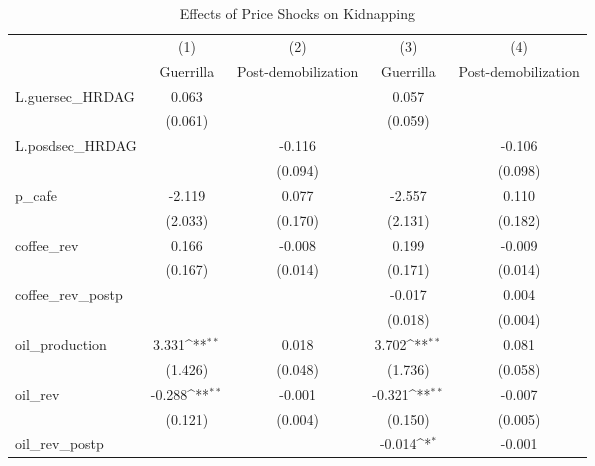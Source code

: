 \begin{table}[htbp]\centering
\def\sym#1{\ifmmode^{#1}\else\(^{#1}\)\fi}
\caption{Effects of Price Shocks on Kidnapping}
\begin{tabular}{l*{4}{c}}
\hline\hline
                &\multicolumn{1}{c}{(1)}&\multicolumn{1}{c}{(2)}&\multicolumn{1}{c}{(3)}&\multicolumn{1}{c}{(4)}\\
                &\multicolumn{1}{c}{Guerrilla}&\multicolumn{1}{c}{Post-demobilization}&\multicolumn{1}{c}{Guerrilla}&\multicolumn{1}{c}{Post-demobilization}\\
\hline
L.guersec\_HRDAG &    0.063         &                  &    0.057         &                  \\
                &  (0.061)         &                  &  (0.059)         &                  \\
[1em]
L.posdsec\_HRDAG &                  &   -0.116         &                  &   -0.106         \\
                &                  &  (0.094)         &                  &  (0.098)         \\
[1em]
p\_cafe          &   -2.119         &    0.077         &   -2.557         &    0.110         \\
                &  (2.033)         &  (0.170)         &  (2.131)         &  (0.182)         \\
[1em]
coffee\_rev      &    0.166         &   -0.008         &    0.199         &   -0.009         \\
                &  (0.167)         &  (0.014)         &  (0.171)         &  (0.014)         \\
[1em]
coffee\_rev\_postp&                  &                  &   -0.017         &    0.004         \\
                &                  &                  &  (0.018)         &  (0.004)         \\
[1em]
oil\_production  &    3.331\sym{**} &    0.018         &    3.702\sym{**} &    0.081         \\
                &  (1.426)         &  (0.048)         &  (1.736)         &  (0.058)         \\
[1em]
oil\_rev         &   -0.288\sym{**} &   -0.001         &   -0.321\sym{**} &   -0.007         \\
                &  (0.121)         &  (0.004)         &  (0.150)         &  (0.005)         \\
[1em]
oil\_rev\_postp   &                  &                  &   -0.014\sym{*}  &   -0.001         \\

\end{tabular}
\end{table}
